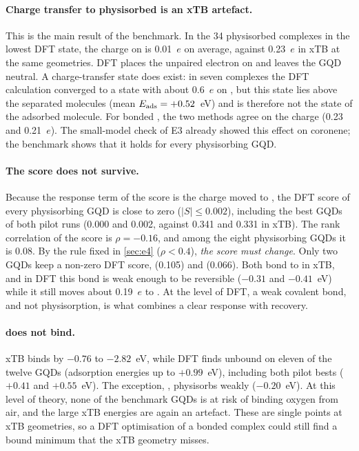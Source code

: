 \paragraph{Charge transfer to physisorbed \NOtwo{} is an xTB artefact.} This is the main result of
the benchmark. In the 34 physisorbed complexes in the lowest DFT state, the charge on  is
0.01~\(e\) on average, against 0.23~\(e\) in xTB at the same geometries. DFT places the unpaired
electron on  and leaves the GQD neutral. A charge-transfer state does exist: in seven
complexes the DFT calculation converged to a state with about 0.6~\(e\) on , but this
state lies above the separated molecules (mean \(E_{\mathrm{ads}} = +0.52\)~eV) and is therefore not the
state of the adsorbed molecule. For bonded , the two methods agree on the charge (0.23
and 0.21~\(e\)). The small-model check of E3 already showed this effect on coronene; the
benchmark shows that it holds for every physisorbing GQD.

\paragraph{The score does not survive.} Because the response term of the score is the charge moved
to , the DFT score of every physisorbing GQD is close to zero (\(|S| \leq 0.002\)), including
the best GQDs of both pilot runs (0.000 and 0.002, against 0.341 and 0.331 in xTB). The rank
correlation of the score is \(\rho = -0.16\), and among the eight physisorbing GQDs it is 0.08. By
the rule fixed in \cref{sec:e4} (\(\rho < 0.4\)), \emph{the score must change}. Only two GQDs keep
a non-zero DFT score,  (0.105) and  (0.066). Both bond to
 in xTB, and in DFT this bond is weak enough to be reversible (\(-0.31\) and
\(-0.41\)~eV) while it still moves about 0.19~\(e\) to . At the level of DFT, a weak
covalent bond, and not physisorption, is what combines a clear response with recovery.

\paragraph{ does not bind.} xTB binds  by \(-0.76\) to \(-2.82\)~eV, while DFT finds
 unbound on eleven of the twelve GQDs (adsorption energies up to \(+0.99\)~eV), including
both pilot bests (\(+0.41\) and \(+0.55\)~eV). The exception, , physisorbs 
weakly (\(-0.20\)~eV). At this level of theory, none of the benchmark GQDs is at risk of
binding oxygen from air, and the large xTB  energies are again an artefact. These are single
points at xTB geometries, so a DFT optimisation of a bonded  complex could still find a
bound minimum that the xTB geometry misses.

